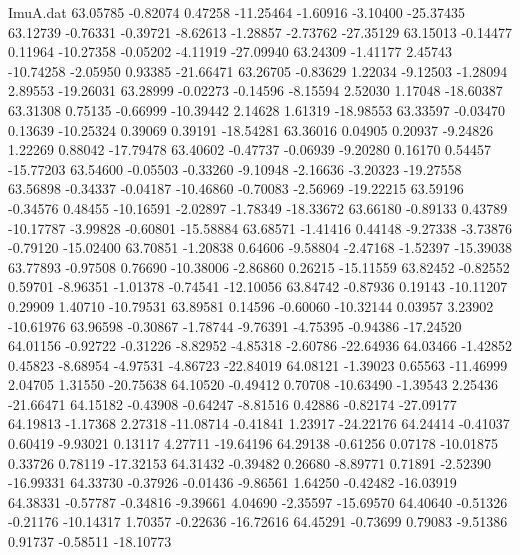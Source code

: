 \begin{filecontents}{ImuA.dat}
  63.05785   -0.82074    0.47258  -11.25464   -1.60916   -3.10400  -25.37435
  63.12739   -0.76331   -0.39721   -8.62613   -1.28857   -2.73762  -27.35129
  63.15013   -0.14477    0.11964  -10.27358   -0.05202   -4.11919  -27.09940
  63.24309   -1.41177    2.45743  -10.74258   -2.05950    0.93385  -21.66471
  63.26705   -0.83629    1.22034   -9.12503   -1.28094    2.89553  -19.26031
  63.28999   -0.02273   -0.14596   -8.15594    2.52030    1.17048  -18.60387
  63.31308    0.75135   -0.66999  -10.39442    2.14628    1.61319  -18.98553
  63.33597   -0.03470    0.13639  -10.25324    0.39069    0.39191  -18.54281
  63.36016    0.04905    0.20937   -9.24826    1.22269    0.88042  -17.79478
  63.40602   -0.47737   -0.06939   -9.20280    0.16170    0.54457  -15.77203
  63.54600   -0.05503   -0.33260   -9.10948   -2.16636   -3.20323  -19.27558
  63.56898   -0.34337   -0.04187  -10.46860   -0.70083   -2.56969  -19.22215
  63.59196   -0.34576    0.48455  -10.16591   -2.02897   -1.78349  -18.33672
  63.66180   -0.89133    0.43789  -10.17787   -3.99828   -0.60801  -15.58884
  63.68571   -1.41416    0.44148   -9.27338   -3.73876   -0.79120  -15.02400
  63.70851   -1.20838    0.64606   -9.58804   -2.47168   -1.52397  -15.39038
  63.77893   -0.97508    0.76690  -10.38006   -2.86860    0.26215  -15.11559
  63.82452   -0.82552    0.59701   -8.96351   -1.01378   -0.74541  -12.10056
  63.84742   -0.87936    0.19143  -10.11207    0.29909    1.40710  -10.79531
  63.89581    0.14596   -0.60060  -10.32144    0.03957    3.23902  -10.61976
  63.96598   -0.30867   -1.78744   -9.76391   -4.75395   -0.94386  -17.24520
  64.01156   -0.92722   -0.31226   -8.82952   -4.85318   -2.60786  -22.64936
  64.03466   -1.42852    0.45823   -8.68954   -4.97531   -4.86723  -22.84019
  64.08121   -1.39023    0.65563  -11.46999    2.04705    1.31550  -20.75638
  64.10520   -0.49412    0.70708  -10.63490   -1.39543    2.25436  -21.66471
  64.15182   -0.43908   -0.64247   -8.81516    0.42886   -0.82174  -27.09177
  64.19813   -1.17368    2.27318  -11.08714   -0.41841    1.23917  -24.22176
  64.24414   -0.41037    0.60419   -9.93021    0.13117    4.27711  -19.64196
  64.29138   -0.61256    0.07178  -10.01875    0.33726    0.78119  -17.32153
  64.31432   -0.39482    0.26680   -8.89771    0.71891   -2.52390  -16.99331
  64.33730   -0.37926   -0.01436   -9.86561    1.64250   -0.42482  -16.03919
  64.38331   -0.57787   -0.34816   -9.39661    4.04690   -2.35597  -15.69570
  64.40640   -0.51326   -0.21176  -10.14317    1.70357   -0.22636  -16.72616
  64.45291   -0.73699    0.79083   -9.51386    0.91737   -0.58511  -18.10773

\end{filecontents}
